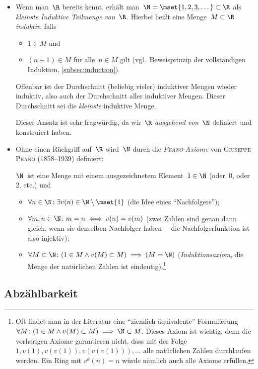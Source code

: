 \documentclass[a4paper]{article}
\begin{document}
\begin{itemize}
    \item Wenn man~$\R$ bereits kennt, erhält man~$\N = \mset{1, 2, 3, \dots} \subset \R$ als \emph{kleinste Induktive Teilmenge von~$\R$}. Hierbei heißt eine Menge~$M \subset \R$ \emph{induktiv}, falls
          \begin{itemize}
              \item $1 \in M$ und
              \item $(n+1) \in M$ für alle~$n \in M$ gilt (vgl.\ Beweisprinzip der vollständigen Induktion, \cref{subsec:induction}).
          \end{itemize}
          Offenbar ist der Durchschnitt (beliebig vieler) induktiver Mengen wieder induktiv, also auch der Durchschnitt aller induktiver Mengen. Dieser Durchschnitt sei die \emph{kleinste} induktive Menge.

          Dieser Ansatz ist sehr fragwürdig, da wir~$\R$ \emph{ausgehend von~$\N$} definiert und konstruiert haben.
    \item Ohne einen Rückgriff auf~$\R$ wird~$\N$ durch die \emph{\textsc{Peano}-Axiome} von \textsc{Giuseppe Peano} (1858--1939) definiert:

          $\N$~ist eine Menge mit einem ausgezeichnetem Element~$1 \in \N$ (oder~$0$, oder~$2$, etc.) und
          \begin{itemize}
              \item $\forall n \in \N\colon \exists v(n) \in \N \setminus \mset{1}$ (die Idee eines "`Nachfolgers"');
              \item $\forall m, n \in \N\colon m = n \iff v(n) = v(m)$ (zwei Zahlen sind genau dann gleich, wenn sie denselben Nachfolger haben~-- die Nachfolgerfunktion ist also injektiv);
              \item $\forall M \subset \N\colon (1 \in M \wedge v(M) \subset M) \implies (M = \N)$ (\emph{Induktionsaxiom}, die Menge der natürlichen Zahlen ist eindeutig).\footnote{Oft findet man in der Literatur eine "`ziemlich äquivalente"' Formulierung $\forall M\colon (1 \in M \wedge v(M) \subset M) \implies \N \subset M$. Dieses Axiom ist wichtig, denn die vorherigen Axiome garantieren nicht, dass mit der Folge $1, v(1), v(v(1)), v(v(v(1))), \dots$ alle natürlichen Zahlen durchlaufen werden. Ein Ring mit $v^k(n) = n$ würde nämlich auch alle Axiome erfüllen.}
          \end{itemize}
\end{itemize}

\subsection{Abzählbarkeit}
\end{document}
